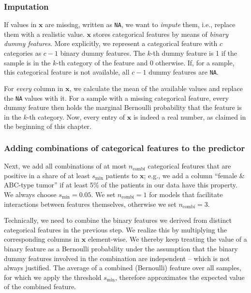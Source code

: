 \subsubsection{Imputation}

If values in $\mathbf{x}$ are missing, written as \texttt{NA}, we want to \textit{impute} them, 
i.e., replace them with a realistic value. $\mathbf{x}$ stores categorical features by means of 
\textit{binary dummy features}. More explicitly, we 
represent a categorical feature with $c$ categories as $c-1$ binary dummy features. The 
$k$-th dummy feature is 1 if the sample is in the $k$-th category of the feature and 0 otherwise.
If, for a sample, this categorical feature is not available, all $c-1$ dummy features are 
\texttt{NA}. 

For \textit{every} column in $\mathbf{x}$, we calculate the mean 
of the available values and replace the \texttt{NA} values with it. For a sample with a missing 
categorical feature, every dummy feature then holds the marginal Bernoulli probability that the 
feature is in the $k$-th category. Now, every entry of $\mathbf{x}$ is indeed a real number, 
as claimed in the beginning of this chapter.

\subsubsection{Adding combinations of categorical features to the predictor}

Next, we add all combinations of at most $n_\text{combi}$ categorical features that are positive in a 
share of at least $s_\text{min}$ patients to $\mathbf{x}$; e.g., we add a column ``female \& ABC-type 
tumor'' if at least \num{5}\% of the patients in our data have this property. We always choose $s_\text{min}
= \num{0.05}$. We set $n_\text{combi} = 1$ for models that facilitate interactions between features 
themselves, otherwise we set $n_\text{combi} = 3$.

Technically, we need to combine the binary features we derived from distinct categorical features 
in the previous step. We realize this by multiplying the corresponding columns in 
$\mathbf{x}$ element-wise. We thereby keep treating the value of a binary feature as a Bernoulli
probability under the assumption that the binary dummy features involved in the combination are 
independent -- which is not always justified. The average of a combined (Bernoulli) feature over all 
samples, for which we apply the threshold $s_\text{min}$, therefore approximates the expected value 
of the combined feature.

